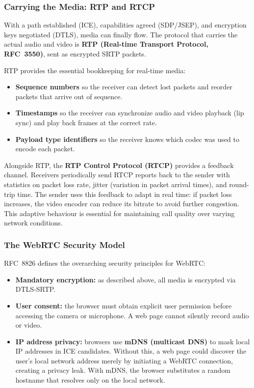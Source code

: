 \documentclass[11pt]{article}
\begin{document}
\subsubsection{Carrying the Media: RTP and RTCP}

With a path established (ICE), capabilities agreed (SDP/JSEP), and
encryption keys negotiated (DTLS), media can finally flow.  The protocol
that carries the actual audio and video is \textbf{RTP (Real-time Transport
Protocol, RFC~3550)}, sent as encrypted SRTP packets.

RTP provides the essential bookkeeping for real-time media:
\begin{itemize}
  \item \textbf{Sequence numbers} so the receiver can detect lost packets
    and reorder packets that arrive out of sequence.
  \item \textbf{Timestamps} so the receiver can synchronize audio and video
    playback (lip sync) and play back frames at the correct rate.
  \item \textbf{Payload type identifiers} so the receiver knows which codec
    was used to encode each packet.
\end{itemize}

Alongside RTP, the \textbf{RTP Control Protocol (RTCP)} provides a feedback
channel.  Receivers periodically send RTCP reports back to the sender with
statistics on packet loss rate, jitter (variation in packet arrival times),
and round-trip time.  The sender uses this feedback to adapt in real time:
if packet loss increases, the video encoder can reduce its bitrate to avoid
further congestion.  This adaptive behaviour is essential for maintaining
call quality over varying network conditions.

\subsubsection{The WebRTC Security Model}

RFC~8826 defines the overarching security principles for WebRTC:
\begin{itemize}
  \item \textbf{Mandatory encryption:} as described above, all media is
    encrypted via DTLS-SRTP.
  \item \textbf{User consent:} the browser must obtain explicit user
    permission before accessing the camera or microphone.  A web page cannot
    silently record audio or video.
  \item \textbf{IP address privacy:} browsers use \textbf{mDNS (multicast
    DNS)} to mask local IP addresses in ICE candidates.  Without this,
    a web page could discover the user's local network address merely by
    initiating a WebRTC connection, creating a privacy leak.  With mDNS,
    the browser substitutes a random hostname that resolves only on the
    local network.
\end{itemize}
\end{document}
